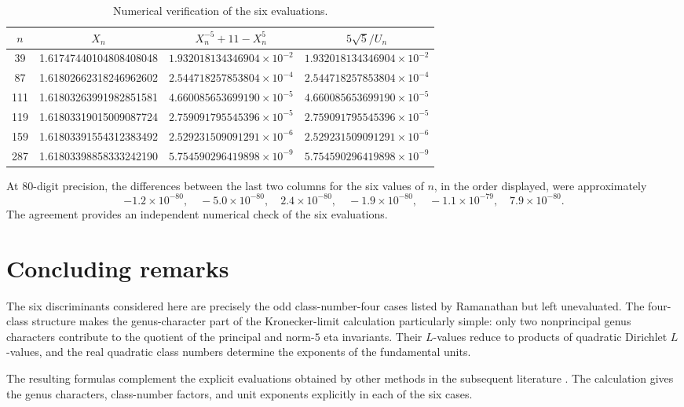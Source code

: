 \documentclass[11pt,a4paper]{article}
\begin{document}
\begin{table}[ht]
\centering
\renewcommand{\arraystretch}{1.15}
\caption{Numerical verification of the six evaluations.}
\label{tab:numerical}
\begin{tabular}{c|c|c|c}
$n$ & $X_n$ & $X_n^{-5}+11-X_n^5$ & $5\sqrt5/U_n$\\ \hline
39  & 1.61747440104808408048 & $1.932018134346904\times10^{-2}$ & $1.932018134346904\times10^{-2}$\\
87  & 1.61802662318246962602 & $2.544718257853804\times10^{-4}$ & $2.544718257853804\times10^{-4}$\\
111 & 1.61803263991982851581 & $4.660085653699190\times10^{-5}$ & $4.660085653699190\times10^{-5}$\\
119 & 1.61803319015009087724 & $2.759091795545396\times10^{-5}$ & $2.759091795545396\times10^{-5}$\\
159 & 1.61803391554312383492 & $2.529231509091291\times10^{-6}$ & $2.529231509091291\times10^{-6}$\\
287 & 1.61803398858333242190 & $5.754590296419898\times10^{-9}$ & $5.754590296419898\times10^{-9}$
\end{tabular}
\end{table}

At 80-digit precision, the differences between the last two columns for the six values of $n$, in the order displayed, were approximately
\[
-1.2\times10^{-80},\quad -5.0\times10^{-80},\quad
2.4\times10^{-80},\quad -1.9\times10^{-80},\quad
-1.1\times10^{-79},\quad 7.9\times10^{-80}.
\]
The agreement provides an independent numerical check of the six evaluations.

\section{Concluding remarks}
The six discriminants considered here are precisely the odd class-number-four cases listed by Ramanathan but left unevaluated.  The four-class structure makes the genus-character part of the Kronecker-limit calculation particularly simple: only two nonprincipal genus characters contribute to the quotient of the principal and norm-$5$ eta invariants.  Their $L$-values reduce to products of quadratic Dirichlet $L$-values, and the real quadratic class numbers determine the exponents of the fundamental units.

The resulting formulas complement the explicit evaluations obtained by other methods in the subsequent literature \cite{BCZ1996,BCZ1997}.  The calculation gives the genus characters, class-number factors, and unit exponents explicitly in each of the six cases.
\end{document}
